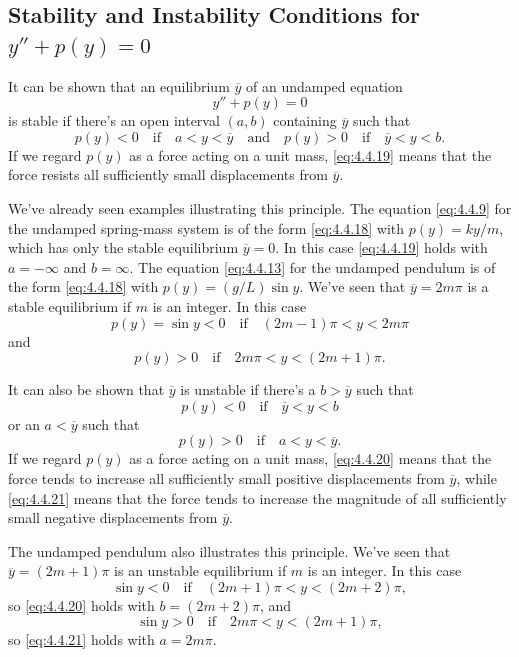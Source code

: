 \documentclass{ximera}
\begin{document}
\subsection*{Stability  and Instability Conditions for $y''+p(y)=0$}

It can be shown %
that an equilibrium
$\overline{y}$ of an undamped equation
\begin{equation} \label{eq:4.4.18}
y''+p(y)=0
\end{equation}
is stable if there's an open interval $(a,b)$ containing $\overline
y$ such that
\begin{equation} \label{eq:4.4.19}
p(y)<0 \quad\mbox{if}\quad a<y<\overline{y}\quad\mbox{and}\quad p(y)>0 \quad\mbox{if}\quad
\overline{y}<y<b.
\end{equation}
If we regard $p(y)$ as a force acting on a unit mass,
\eqref{eq:4.4.19} means that the force resists all sufficiently small
displacements from $\overline{y}$.


We've already seen examples illustrating this principle. The equation
\eqref{eq:4.4.9} for the undamped spring-mass system is of the form
\eqref{eq:4.4.18} with $p(y)=ky/m$, which has only the stable equilibrium
$\overline{y}=0$. In this case \eqref{eq:4.4.19} holds with $a=-\infty$ and
$b=\infty$. The equation \eqref{eq:4.4.13} for the undamped pendulum is of
the form \eqref{eq:4.4.18} with $p(y)=(g/L)\sin y$. We've seen that
$\overline{y}=2m\pi$ is a stable equilibrium if $m$ is an integer. In
this case
$$
p(y)=\sin y<0
\quad\mbox{if}\quad(2m-1)\pi<y<2m\pi
$$
and
$$
p(y)>0 \quad\mbox{if}\quad 2m\pi<y<(2m+1)\pi.
$$

It can also be shown %
that $\overline{y}$ is
unstable if there's a $b>\overline{y}$ such that
\begin{equation} \label{eq:4.4.20}
p(y)<0\quad\mbox{if}\quad\overline{y}<y<b
\end{equation}
or an $a<\overline{y}$ such that
\begin{equation} \label{eq:4.4.21}
p(y)>0\quad\mbox{if}\quad a<y<\overline{y}.
\end{equation}
If we regard $p(y)$ as a force acting on a unit mass,
\eqref{eq:4.4.20} means that the force tends to increase all sufficiently
small positive displacements from $\overline{y}$, while \eqref{eq:4.4.21}
means that the force tends to increase the magnitude of all
sufficiently small negative displacements from $\overline{y}$.

The undamped pendulum also illustrates this principle. We've seen that
$\overline{y}=(2m+1)\pi$ is an unstable equilibrium if $m$ is an
integer. In this case
$$
\sin y<0\quad\mbox{if}\quad(2m+1)\pi<y<(2m+2)\pi,
$$
so \eqref{eq:4.4.20} holds with $b=(2m+2)\pi$, and
$$
\sin y>0\quad\mbox{if}\quad 2m\pi<y<(2m+1)\pi,
$$
so \eqref{eq:4.4.21} holds with $a=2m\pi$.
\end{document}
